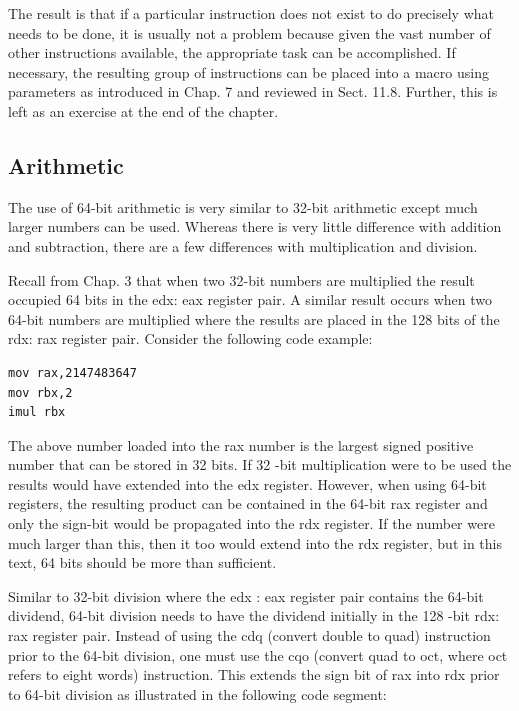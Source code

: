 \documentclass[10pt]{book}
\begin{document}
The result is that if a particular instruction does not exist to do precisely what needs to be done, it is usually not a problem because given the vast number of other instructions available, the appropriate task can be accomplished. If necessary, the resulting group of instructions can be placed into a macro using parameters as introduced in Chap. 7 and reviewed in Sect. 11.8. Further, this is left as an exercise at the end of the chapter.

\subsection{Arithmetic}
The use of 64-bit arithmetic is very similar to 32-bit arithmetic except much larger numbers can be used. Whereas there is very little difference with addition and subtraction, there are a few differences with multiplication and division.

Recall from Chap. 3 that when two 32-bit numbers are multiplied the result occupied 64 bits in the edx: eax register pair. A similar result occurs when two 64-bit numbers are multiplied where the results are placed in the 128 bits of the rdx: rax register pair. Consider the following code example:

\begin{verbatim}
mov rax,2147483647
mov rbx,2
imul rbx
\end{verbatim}

The above number loaded into the rax number is the largest signed positive number that can be stored in 32 bits. If 32 -bit multiplication were to be used the results would have extended into the edx register. However, when using 64-bit registers, the resulting product can be contained in the 64-bit rax register and only the sign-bit would be propagated into the rdx register. If the number were much larger than this, then it too would extend into the rdx register, but in this text, 64 bits should be more than sufficient.

Similar to 32-bit division where the edx : eax register pair contains the 64-bit dividend, 64-bit division needs to have the dividend initially in the 128 -bit rdx:\\
rax register pair. Instead of using the cdq (convert double to quad) instruction prior to the 64-bit division, one must use the cqo (convert quad to oct, where oct refers to eight words) instruction. This extends the sign bit of rax into rdx prior to 64-bit division as illustrated in the following code segment:
\end{document}
